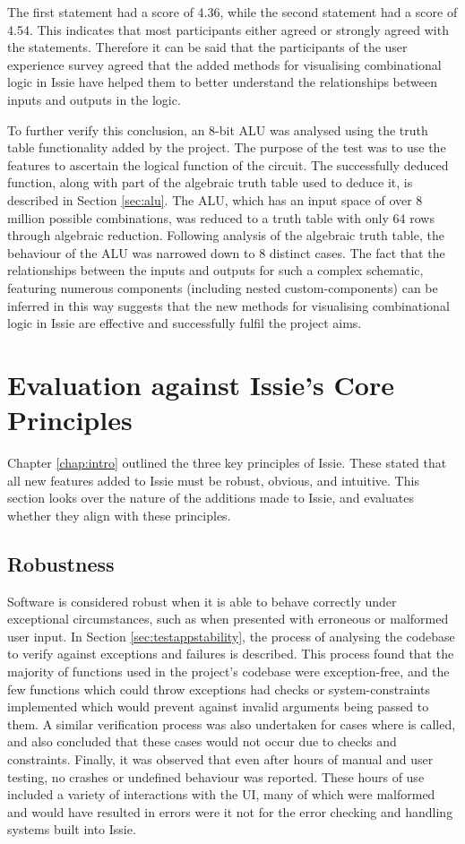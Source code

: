 The first statement had a score of 4.36, while the second statement had a score of 4.54. This indicates that most participants either agreed or strongly agreed with the statements. Therefore it can be said that the participants of the user experience survey agreed that the added methods for visualising combinational logic in Issie have helped them to better understand the relationships between inputs and outputs in the logic. 

To further verify this conclusion, an 8-bit ALU was analysed using the truth table functionality added by the project. The purpose of the test was to use the features to ascertain the logical function of the circuit. The successfully deduced function, along with part of the algebraic truth table used to deduce it, is described in Section \ref{sec:alu}. The ALU, which has an input space of over 8 million possible combinations, was reduced to a truth table with only 64 rows through algebraic reduction. Following analysis of the algebraic truth table, the behaviour of the ALU was narrowed down to 8 distinct cases. 
The fact that the relationships between the inputs and outputs for such a complex schematic, featuring numerous components (including nested custom-components) can be inferred in this way suggests that the new methods for visualising combinational logic in Issie are effective and successfully fulfil the project aims.

\section{Evaluation against Issie's Core Principles}
Chapter \ref{chap:intro} outlined the three key principles of Issie. These stated that all new features added to Issie must be robust, obvious, and intuitive. This section looks over the nature of the additions made to Issie, and evaluates whether they align with these principles.
\subsection{Robustness}
Software is considered robust when it is able to behave correctly under exceptional circumstances, such as when presented with erroneous or malformed user input. In Section \ref{sec:testappstability}, the process of analysing the codebase to verify against exceptions and failures is described. This process found that the majority of functions used in the project's codebase were exception-free, and the few functions which could throw exceptions had checks or system-constraints implemented which would prevent against invalid arguments being passed to them. A similar verification process was also undertaken for cases where  is called, and also concluded that these cases would not occur due to checks and constraints. Finally, it was observed that even after hours of manual and user testing, no crashes or undefined behaviour was reported. These hours of use included a variety of interactions with the UI, many of which were malformed and would have resulted in errors were it not for the error checking and handling systems built into Issie.


